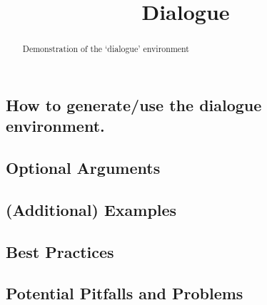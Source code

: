\documentclass{ximera}
\title{Dialogue}
\begin{document}
\begin{abstract}
    Demonstration of the `dialogue' environment
\end{abstract}
\maketitle


    \subsection*{How to generate/use the dialogue environment.}
        
        
        
    \subsection*{Optional Arguments}
    
        
        
    \subsection*{(Additional) Examples}
        
        
        
    \subsection*{Best Practices}
    
        
        
    \subsection*{Potential Pitfalls and Problems}   
        
        
        
        
\end{document}
